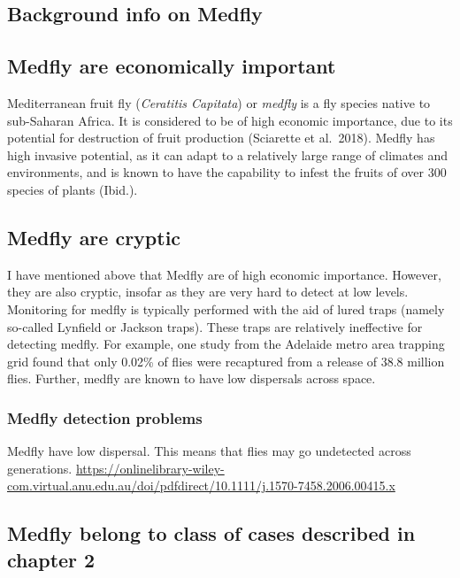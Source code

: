 \documentclass[
]{book}
\begin{document}
\hypertarget{background-info-on-medfly}{%
\subsection{Background info on Medfly}\label{background-info-on-medfly}}

\hypertarget{medfly-are-economically-important}{%
\subsection{Medfly are economically important}\label{medfly-are-economically-important}}

Mediterranean fruit fly (\emph{Ceratitis Capitata}) or \emph{medfly} is a fly species native to sub-Saharan Africa. It is considered to be of high economic importance, due to its potential for destruction of fruit production (Sciarette et al.~2018). Medfly has high invasive potential, as it can adapt to a relatively large range of climates and environments, and is known to have the capability to infest the fruits of over 300 species of plants (Ibid.).

\hypertarget{medfly-are-cryptic}{%
\subsection{Medfly are cryptic}\label{medfly-are-cryptic}}

I have mentioned above that Medfly are of high economic importance. However, they are also cryptic, insofar as they are very hard to detect at low levels. Monitoring for medfly is typically performed with the aid of lured traps (namely so-called Lynfield or Jackson traps). These traps are relatively ineffective for detecting medfly. For example, one study from the Adelaide metro area trapping grid found that only 0.02\% of flies were recaptured from a release of 38.8 million flies. Further, medfly are known to have low dispersals across space.

\hypertarget{medfly-detection-problems}{%
\subsubsection{Medfly detection problems}\label{medfly-detection-problems}}

Medfly have low dispersal. This means that flies may go undetected across generations. \url{https://onlinelibrary-wiley-com.virtual.anu.edu.au/doi/pdfdirect/10.1111/j.1570-7458.2006.00415.x}

\hypertarget{medfly-belong-to-class-of-cases-described-in-chapter-2}{%
\subsection{Medfly belong to class of cases described in chapter 2}\label{medfly-belong-to-class-of-cases-described-in-chapter-2}}
\end{document}
